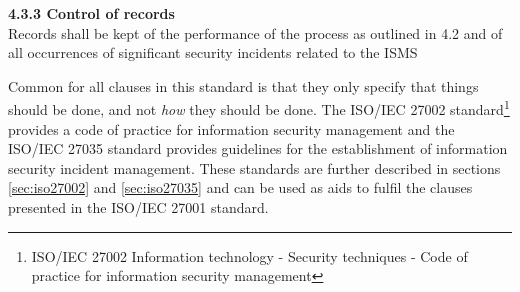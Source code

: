 \textbf{4.3.3 Control of records}\\
Records shall be kept of the performance of the process as outlined in 4.2 and of all occurrences of significant security incidents related to the \ac{ISMS}

Common for all clauses in this standard is that they only specify that things should be done, and not \textit{how} they should be done. The \acs{ISO}/\acs{IEC} 27002 standard\footnote{ \acs{ISO}/\acs{IEC} 27002 Information technology - Security techniques
- Code of practice for information security management} provides a code of practice for information security management and the \acs{ISO}/\acs{IEC} 27035 standard provides guidelines for the establishment of information security incident management. These standards are further described in sections \ref{sec:iso27002} and \ref{sec:iso27035} and can be used as aids to fulfil the clauses presented in the \acs{ISO}/\acs{IEC} 27001 standard.